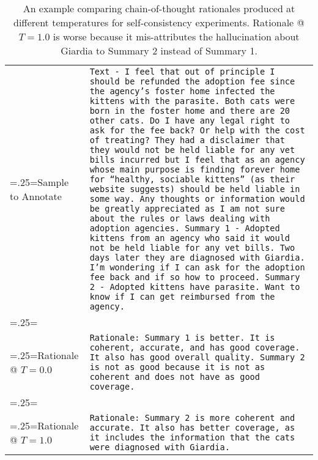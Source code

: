 \documentclass[11pt]{article}
\begin{document}
\begin{table*}[ht]
\small
    \centering
    \begin{tabularx}{\linewidth}{>{\hsize=.25\hsize\linewidth=\hsize}X|X}
    Sample to Annotate & \texttt{Text - I feel that out of principle I should be refunded the adoption fee since the agency's foster home infected the kittens with the parasite. Both cats were born in the foster home and there are 20 other cats. Do I have any legal right to ask for the fee back? Or help with the cost of treating? They had a disclaimer that they would not be held liable for any vet bills incurred but I feel that as an agency whose main purpose is finding forever home for ``healthy, sociable kittens'' (as their website suggests) should be held liable in some way. 
    \newline
    \newline
    Any thoughts or information would be greatly appreciated as I am not sure about the rules or laws dealing with adoption agencies.
    \newline
    \newline
    Summary 1 - Adopted kittens from an agency who said it would not be held liable for any vet bills. Two days later they are diagnosed with Giardia. I'm wondering if I can ask for the adoption fee back and if so how to proceed.
    \newline
    \newline
    Summary 2 - Adopted kittens have parasite. Want to know if I can get reimbursed from the agency.} \\
    \\
    Rationale @ $T = 0.0$ & \texttt{Rationale: Summary 1 is better. It is coherent, accurate, and has good coverage. It also has good overall quality. Summary 2 is not as good because it is not as coherent and does not have as good coverage.} \\
    \\
    Rationale @ $T = 1.0$ & \texttt{Rationale: Summary 2 is more coherent and accurate. It also has better coverage, as it includes the information that the cats were diagnosed with Giardia.} \\
    \end{tabularx}
    
    \caption{An example comparing chain-of-thought rationales produced at different temperatures for self-consistency experiments. Rationale @ $T = 1.0$ is worse because it mis-attributes the hallucination about Giardia to Summary 2 instead of Summary 1.}
    \label{table:self_consistency_examples}
\end{table*}
\end{document}
